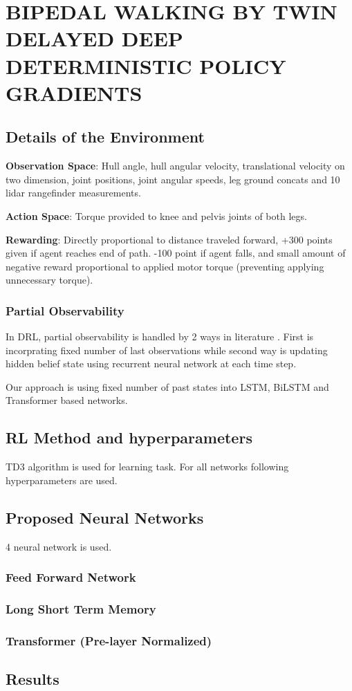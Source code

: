 \chapter{BIPEDAL WALKING BY TWIN DELAYED DEEP DETERMINISTIC POLICY GRADIENTS}
\label{chap:exp_setup}

\section{Details of the Environment}

\textbf{Observation Space}: Hull angle, hull angular velocity, translational velocity on two dimension, joint positions, joint angular speeds, leg ground concats and 10 lidar rangefinder measurements.

\textbf{Action Space}: Torque provided to knee and pelvis joints of both legs.

\textbf{Rewarding}: Directly proportional to distance traveled forward, +300 points given if agent reaches end of path. -100 point if agent falls, and small amount of negative reward proportional to applied motor torque (preventing applying unnecessary torque).

\subsection{Partial Observability}
In DRL, partial observability is handled by 2 ways in literature \cite{dulac-arnold_challenges_2019}. First is incorprating fixed number of last observations while second way is updating hidden belief state using recurrent neural network at each time step. 

Our approach is using fixed number of past states into LSTM, BiLSTM and Transformer based networks. 

\section{RL Method and hyperparameters}
TD3 algorithm is used for learning task. For all networks following hyperparameters are used.

\section{Proposed Neural Networks}

4 neural network is used. 

\subsection{Feed Forward Network}

\subsection{Long Short Term Memory}

\subsection{Transformer (Pre-layer Normalized)}

\section{Results}